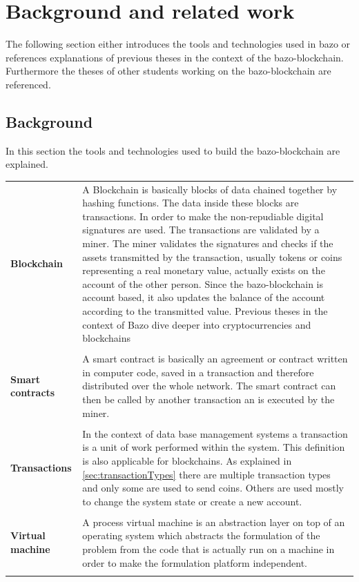 \chapter{Background and related work}
\thispagestyle{main} %
The following section either introduces the tools and technologies used in bazo or references explanations of previous theses in the context of the bazo-blockchain. Furthermore the theses of other students working on the bazo-blockchain are referenced.

\section{Background}
In this section the tools and technologies used to build the bazo-blockchain are explained.

\begin{tabular}[t]{ p{3cm} p{12.5cm}}
\textbf{Blockchain} & 
A Blockchain is basically blocks of data chained together by hashing functions. The data inside these blocks are transactions. In order to make the non-repudiable digital signatures are used. The transactions are validated by a miner. The miner validates the signatures and checks if the assets transmitted by the transaction, usually tokens or coins representing a real monetary value, actually exists on the account of the other person. Since the bazo-blockchain is account based, it also updates the balance of the account according to the transmitted value. Previous theses in the context of Bazo dive deeper into cryptocurrencies and blockchains \cite{ba_miner} \cite{ba_client}  \\ \\

\raggedright
\textbf{Smart contracts} &
A smart contract is basically an agreement or contract written in computer code, saved in a transaction and therefore distributed over the whole network. The smart contract can then be called by another transaction an is executed by the miner. \\ \\

\textbf{Transactions} &
In the context of data base management systems a transaction is a unit of work performed within the system. \cite{dbtransaction} This definition is also applicable for blockchains. As explained in \autoref{sec:transactionTypes}
there are multiple transaction types and only some are used to send coins. Others are used mostly to change the system state or create a new account. \\ \\

\raggedright
\textbf{Virtual machine} &
A process virtual machine is an abstraction layer on top of an operating system which abstracts the formulation of the problem from the code that is actually run on a machine in order to make the formulation platform independent. \\ \\
\end{tabular}
\pagebreak


